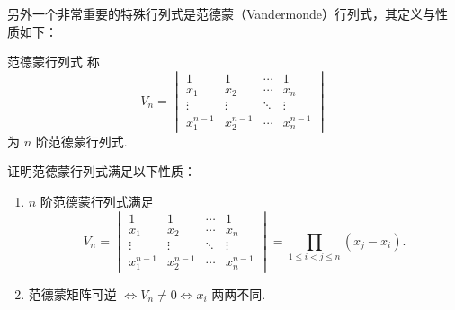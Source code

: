 另外一个非常重要的特殊行列式是范德蒙（Vandermonde）行列式，其定义与性质如下：

\begin{definition}{范德蒙行列式}{}
    称
    \[V_n=\begin{vmatrix}
            1         & 1         & \cdots & 1         \\
            x_1       & x_2       & \cdots & x_n       \\
            \vdots    & \vdots    & \ddots & \vdots    \\
            x_1^{n-1} & x_2^{n-1} & \cdots & x_n^{n-1}
        \end{vmatrix}\]
    为 $n$ 阶范德蒙行列式.
\end{definition}

\begin{example}{}{}
    证明范德蒙行列式满足以下性质：
    \begin{enumerate}
        \item $n$ 阶范德蒙行列式满足
            \[
                V_n=\begin{vmatrix}
                    1         & 1         & \cdots & 1         \\
                    x_1       & x_2       & \cdots & x_n       \\
                    \vdots    & \vdots    & \ddots & \vdots    \\
                    x_1^{n-1} & x_2^{n-1} & \cdots & x_n^{n-1}
                \end{vmatrix}=\prod_{1 \leqslant i < j \leqslant n}(x_j-x_i).
            \]
        \item 范德蒙矩阵可逆 $\iff V_n \neq 0 \iff x_i$ 两两不同.
    \end{enumerate}
\end{example}

